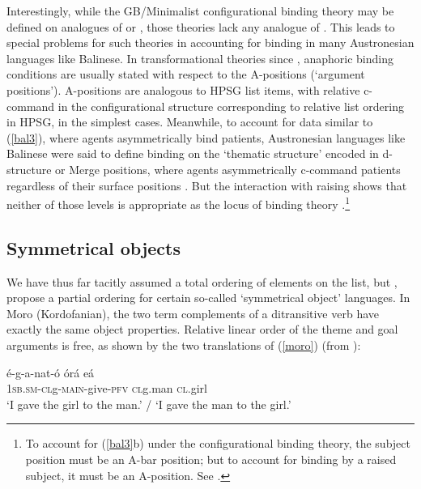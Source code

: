 \documentclass[output=paper]{langsci/langscibook}
\begin{document}
Interestingly, while the GB/Minimalist configurational binding theory may be defined on analogues of \val or \content,  those theories lack any analogue of \argst.  This leads to special problems for such theories in accounting for binding in many Austronesian languages like Balinese.  In transformational theories since \citet{chomsky:1981}, anaphoric binding conditions are usually stated with respect to the A-positions (`argument positions').  A-positions are analogous to HPSG \val list items, with relative c-command in the configurational structure corresponding to relative list ordering in HPSG, in the simplest cases.  Meanwhile, to account for data similar to (\ref{bal3}), where agents asymmetrically bind patients, Austronesian languages like Balinese were said to define binding on the `thematic structure' encoded in d-structure or Merge positions, where agents asymmetrically c-command patients regardless of their surface positions \citep{Guilfoyle+etal:1992}.  But the interaction with raising shows that neither of those levels is appropriate as the locus of binding theory \citep{Wechsler1999}.\footnote{To account for (\ref{bal3}b) under the configurational binding theory, the subject position must be an A-bar position; but to account for binding by a raised subject, it must be an A-position.  See \citet{Wechsler1999}. } 

\subsection{Symmetrical objects}
We have thus far tacitly assumed a total ordering of elements on the \argst list, but \citet{AMM2013a}, \citet{Ackermanetal2017} propose a partial ordering for certain so-called `symmetrical object' languages.  In Moro (Kordofanian), the two term complements of a ditransitive verb have exactly the same object properties.  Relative linear order of the theme and goal arguments is free, as shown by the two translations of (\ref{moro}) (from \citealt[9]{Ackermanetal2017}):


\begin{exe}
	\ex\label{moro}
\gll   \'{e}-g-a-nat-\'{o} \'{o}r\'{a}  e\'{a}  \\
        1\textsc{sb.sm-cl}g-\textsc{main}-give-\textsc{pfv}    \textsc{cl}g.man \textsc{cl}.girl \\
\glt `I gave the girl to the man.’ / `I gave the man to the girl.’
\end{exe} 
\end{document}

